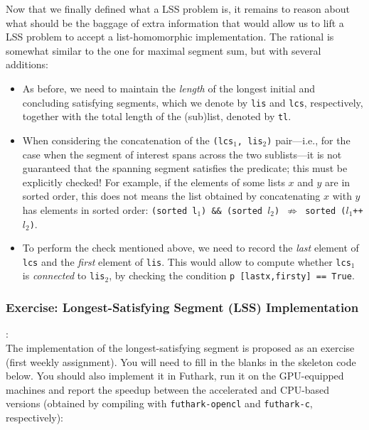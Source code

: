 \documentclass[acmsmall,review]{acmart}\settopmatter{printfolios=true,printccs=false,printacmref=false}
\begin{document}
Now that we finally defined what a LSS problem is, it remains to reason about
what should be the baggage of extra information that would allow us to lift a 
LSS problem to accept a list-homomorphic implementation. The rational is
somewhat similar to the one for maximal segment sum, but with several additions:

\begin{itemize}
    \item As before, we need to maintain the \emph{length} of the longest 
            initial and concluding satisfying segments, which we denote
            by {\tt lis} and {\tt lcs}, respectively, together with the
            total length of the (sub)list, denoted by {\tt tl}.

    \item When considering the concatenation of the {\tt (lcs$_1$, lis$_2$)} 
            pair---i.e., for the case when the segment of interest spans 
            across the two sublists---it is not guaranteed that the spanning 
            segment satisfies the predicate; this must be explicitly checked! 
            For example, if the elements of some lists $x$ and $y$ are in 
            sorted order, this does not means the list obtained by 
            concatenating $x$ with $y$ has elements in sorted order: 
            {\tt (sorted l$_1$) \&\& (sorted $l_2$) $\not\Rightarrow$ sorted ($l_1$++$l_2$)}.  
            
    \item To perform the check mentioned above, we need to record the 
            \emph{last} element of {\tt lcs} and the \emph{first} element of {\tt lis}.
            This would allow to compute whether {\tt lcs$_1$} is \emph{connected} 
            to {\tt lis$_2$}, by checking the condition {\tt p [lastx,firsty] == True}.
\end{itemize}

\subsubsection{Exercise: Longest-Satisfying Segment (LSS) Implementation}:
$\mbox{ }$\\

The implementation of the longest-satisfying segment is proposed as an exercise
(first weekly assignment).  You will need to fill in the blanks in the skeleton
code below. You should also implement it in Futhark, run it on the GPU-equipped
machines and report the speedup between the accelerated and CPU-based versions
(obtained by compiling with {\tt futhark-opencl} and {\tt futhark-c}, 
respectively):\bigskip
\end{document}
